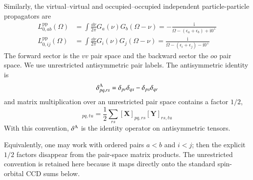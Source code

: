 \documentclass[aip,jcp,reprint,noshowkeys,superscriptaddress]{revtex4-1}
\newcommand{\pp}{\text{pp}}
\newcommand{\ii}{\mathrm{i}}
\newcommand{\bX}{\boldsymbol{X}}
\newcommand{\bY}{\boldsymbol{Y}}
\begin{document}
Similarly, the virtual--virtual and occupied--occupied independent
particle-particle propagators are
\begin{align}
    L_{0,ab}^{\pp}(\Omega)
    &=
    \int\frac{\dd{\nu}}{2\pi}
    G_a(\nu)G_b(\Omega-\nu)
    =
    -\frac{\ii}{\Omega-(\epsilon_a+\epsilon_b)+\ii 0^+}
    \\
    L_{0,ij}^{\pp}(\Omega)
    &=
    \int\frac{\dd{\nu}}{2\pi}
    G_i(\nu)G_j(\Omega-\nu)
    =
    \frac{\ii}{\Omega-(\epsilon_i+\epsilon_j)-\ii 0^+}
    \label{eq:L0_pp_integrated}
\end{align}
The forward sector is the $vv$ pair space and the backward sector the $oo$
pair space.
We use unrestricted antisymmetric pair labels.  The antisymmetric identity is
\begin{equation*}
    \delta^{\rm A}_{pq,rs}
    =
    \delta_{pr}\delta_{qs}-\delta_{ps}\delta_{qr}
\end{equation*}
and matrix multiplication over an unrestricted pair space contains a factor
$1/2$,
\begin{equation}
    [\bX\cdot\bY]_{pq,tu}
    =
    \frac12\sum_{rs}[\bX]_{pq,rs}[\bY]_{rs,tu}
    \label{eq:pair_product}
\end{equation}
With this convention, $\delta^{\rm A}$ is the identity operator on
antisymmetric tensors.

Equivalently, one may work with ordered pairs $a<b$ and $i<j$; then the
explicit $1/2$ factors disappear from the pair-space matrix products.  The
unrestricted convention is retained here because it maps directly onto the
standard spin-orbital CCD sums below.
\end{document}

